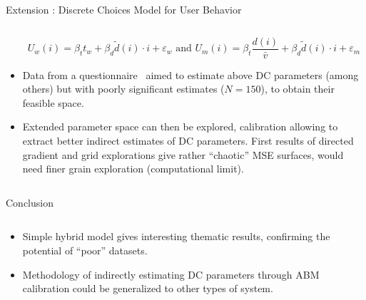 \documentclass{beamer}
\begin{document}
\begin{frame}{}
\begin{columns}[t]
\begin{column}{.49\textwidth}
\begin{block}{Extension : Discrete Choices Model for User Behavior}
\begin{columns}[t]
\begin{column}{.95\textwidth}
\begin{itemize}
        \vspace{-1cm}
        \[
U_w(i)=\beta_t t_w + \beta_d \tilde{d}(i) \cdot i + \varepsilon_w
 \textrm{ and }
U_m(i)=\beta_t \frac{d(i)}{\bar{v}} + \beta_d \tilde{d}(i) \cdot i + \varepsilon_m
\]



\item\begin{justify}Data from a questionnaire~\cite{bourcet2014vlib} aimed to estimate above DC parameters (among others) but with poorly significant estimates ($N=150$), to obtain their feasible space.
\end{justify}

\item\begin{justify}Extended parameter space can then be explored, calibration allowing to extract better indirect estimates of DC parameters. First results of directed gradient and grid explorations give rather ``chaotic'' MSE surfaces, would need finer grain exploration (computational limit).
\end{justify}



\end{itemize}

        
          \end{column}
          \end{columns}
        \end{block}




        \begin{block}{Conclusion}
         \begin{columns}[t]
        \begin{column}{.95\textwidth}
         \vspace{-2cm} 
          \begin{justify}
          \begin{itemize}
          \item Simple hybrid model gives interesting thematic results, confirming the potential of ``poor'' datasets.
          \item Methodology of indirectly estimating DC parameters through ABM calibration could be generalized to other types of system.
          \end{itemize}
          \end{justify}
          \end{column}
          \end{columns}
       \end{block}
        

\end{column}
\end{columns}
\end{frame}
\end{document}
